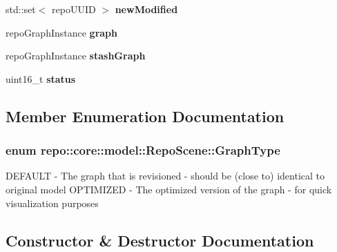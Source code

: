 \begin{DoxyCompactItemize}
\item 
\hypertarget{classrepo_1_1core_1_1model_1_1_repo_scene_a80edbb12f455e0ed8d9e9876462bb3e2}{}std\+::set$<$ repo\+U\+U\+I\+D $>$ {\bfseries new\+Modified}\label{classrepo_1_1core_1_1model_1_1_repo_scene_a80edbb12f455e0ed8d9e9876462bb3e2}

\item 
\hypertarget{classrepo_1_1core_1_1model_1_1_repo_scene_a5e10c6cbad07b182d8ee54692b0d003b}{}repo\+Graph\+Instance {\bfseries graph}\label{classrepo_1_1core_1_1model_1_1_repo_scene_a5e10c6cbad07b182d8ee54692b0d003b}

\item 
\hypertarget{classrepo_1_1core_1_1model_1_1_repo_scene_a07a6a53d21f38dce5df162124f07690a}{}repo\+Graph\+Instance {\bfseries stash\+Graph}\label{classrepo_1_1core_1_1model_1_1_repo_scene_a07a6a53d21f38dce5df162124f07690a}

\item 
\hypertarget{classrepo_1_1core_1_1model_1_1_repo_scene_a626174255cd4dcb4072e46d5603ca833}{}uint16\+\_\+t {\bfseries status}\label{classrepo_1_1core_1_1model_1_1_repo_scene_a626174255cd4dcb4072e46d5603ca833}

\end{DoxyCompactItemize}


\subsection{Member Enumeration Documentation}
\hypertarget{classrepo_1_1core_1_1model_1_1_repo_scene_aefcacd6eb4c7774ac1bfe3a6b223337c}{}
\subsubsection[{Graph\+Type}]{\setlength{\rightskip}{0pt plus 5cm}enum {\bf repo\+::core\+::model\+::\+Repo\+Scene\+::\+Graph\+Type}\hspace{0.3cm}{\ttfamily [strong]}}\label{classrepo_1_1core_1_1model_1_1_repo_scene_aefcacd6eb4c7774ac1bfe3a6b223337c}
D\+E\+F\+A\+U\+L\+T -\/ The graph that is revisioned -\/ should be (close to) identical to original model O\+P\+T\+I\+M\+I\+Z\+E\+D -\/ The optimized version of the graph -\/ for quick visualization purposes 

\subsection{Constructor \& Destructor Documentation}
\hypertarget{classrepo_1_1core_1_1model_1_1_repo_scene_ae56a2c2f4932c2391fb6d9a31031f26c}{}
